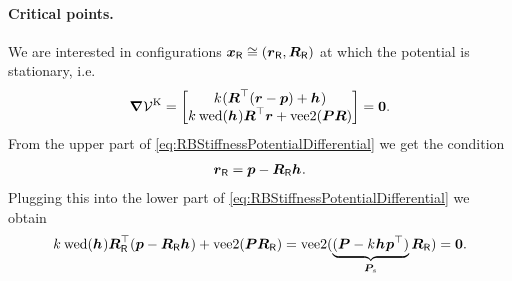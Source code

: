 \paragraph{Critical points.}
We are interested in configurations $\boldsymbol{x}_{\mathsf{R}}\cong (\boldsymbol{r}_{\mathsf{R}}, \boldsymbol{R}_{\mathsf{R}})$ at which the potential is stationary, i.e.
\begin{align}\label{eq:RBStiffnessPotentialDifferential}
\differential \potentialStiff
 = \begin{bmatrix} \bodyStiffness{}{} (\R^\top (\r - \tuple{p}) + \bodyCOS{}{}) \\ \bodyStiffness{}{} \wedOp(\bodyCOS{}{}) \R^\top \r + \veeTwoOp(\mat{P} \R) \end{bmatrix} = \tuple{0}
 .
\end{align}
From the upper part of \eqref{eq:RBStiffnessPotentialDifferential} we get the condition
\begin{align}
 \rR = \tuple{p} - \RR \bodyCOS{}{}.
\end{align}
Plugging this into the lower part of \eqref{eq:RBStiffnessPotentialDifferential} we obtain
\begin{align}
 \bodyStiffness{}{} \wedOp(\bodyCOS{}{}) \RR^\top (\tuple{p} - \RR \bodyCOS{}{}) + \veeTwoOp(\mat{P} \RR)
 = \veeTwoOp(\underbrace{(\mat{P} - \bodyStiffness{}{}\bodyCOS{}{}\tuple{p}^\top)}_{\mat{P}_{\!s}} \RR ) = \tuple{0}.
\end{align}
